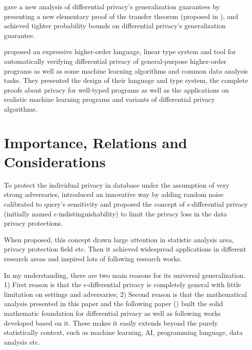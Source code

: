 \documentclass{article}
\begin{document}
\cite{jung2019new} gave a new analysis of differential privacy's generalization guarantees by presenting a new elementary proof of the transfer theorem (proposed in \cite{dwork2015generalization}), and achieved tighter probability bounds on differential privacy's generalization guarantee.

\cite{near2019duet} proposed an expressive higher-order language, linear type system and tool for automatically verifying differential privacy of general-purpose higher-order programs as well as some machine learning algorithms and common data analysis tasks. They presented the design of their language and type system, the complete proofs about privacy for well-typed programs as well as the applications on realistic machine learning programs and variants of differential privacy algorithms.




\section{Importance, Relations and Considerations}

To protect the individual privacy in database under the assumption of very strong adversaries, \cite{dwork2006calibrating} introduced an innovative way by adding random noise calibrated to query's sensitivity and proposed the concept of $\epsilon$-differential privacy (initially named $\epsilon$-indistinguishability) to limit the privacy loss in the data privacy protections.

When proposed, this concept drawn large attention in statistic analysis area, privacy protection field etc. Then it achieved widespread applications in different research areas and inspired lots of following research works.

In my understanding, there are two main reasons for its universal generalization. 1) First reason is that the $\epsilon$-differential privacy is completely general with little limitation on settings and adversaries; 2) Second reason is that the mathematical analysis presented in this paper and the following paper (\cite{dwork2014algorithmic}) built the solid mathematic foundation for differential privacy as well as following works developed based on it. These makes it easily extends beyond the purely statistically context, such as machine learning, AI, programming language, data analysis etc. 
\end{document}
